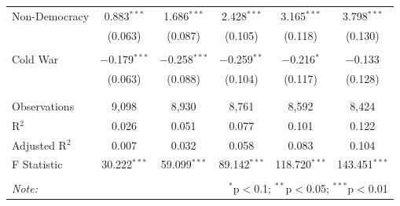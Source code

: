 \documentclass[
  12pt,
]{report}
\begin{document}
\begin{table}
{\begin{tabular}{@{\extracolsep{10pt}}lccccc}
 Non-Democracy & 0.883$^{***}$ & 1.686$^{***}$ & 2.428$^{***}$ & 3.165$^{***}$ & 3.798$^{***}$ \\ 
  & (0.063) & (0.087) & (0.105) & (0.118) & (0.130) \\ 
  & & & & & \\ 
 Cold War & $-$0.179$^{***}$ & $-$0.258$^{***}$ & $-$0.259$^{**}$ & $-$0.216$^{*}$ & $-$0.133 \\ 
  & (0.063) & (0.088) & (0.104) & (0.117) & (0.128) \\ 
  & & & & & \\ 
\hline \\[-1.8ex] 
Observations & 9,098 & 8,930 & 8,761 & 8,592 & 8,424 \\ 
R$^{2}$ & 0.026 & 0.051 & 0.077 & 0.101 & 0.122 \\ 
Adjusted R$^{2}$ & 0.007 & 0.032 & 0.058 & 0.083 & 0.104 \\ 
F Statistic & 30.222$^{***}$ & 59.099$^{***}$ & 89.142$^{***}$ & 118.720$^{***}$ & 143.451$^{***}$ \\ 
\hline 
\hline \\[-1.8ex] 
\textit{Note:}  & \multicolumn{5}{r}{$^{*}$p$<$0.1; $^{**}$p$<$0.05; $^{***}$p$<$0.01} \\ 
\end{tabular}

}

\end{table}%
\end{document}

